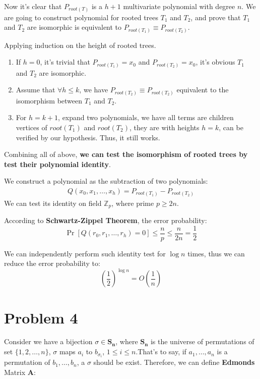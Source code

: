 \documentclass[a4paper, 12pt, titlepage]{article}
\begin{document}
Now it's clear that $P_{root(T)}$ is a $h + 1$ multivariate polynomial with degree $n$.
We are going to construct polynomial for rooted trees $T_{1}$ and $T_{2}$, and prove that $T_{1}$ and $T_{2}$ are isomorphic is equivalent to $P_{root(T_{1})} \equiv P_{root(T_{2})}$.

Applying induction on the height of rooted trees.
\begin{enumerate}[1]
    \item If $h = 0$, it's trivial that $P_{root(T_{1})} = x_{0}$ and $P_{root(T_{2})} = x_{0}$, it's obvious $T_{1}$ and $T_{2}$ are isomorphic.
    \item Assume that $\forall h \leq k$, we have $P_{root(T_{2})} \equiv P_{root(T_{2})}$ equivalent to the isomorphism between $T_{1}$ and $T_{2}$.
    \item For $h = k + 1$, expand two polynomials, we have all terms are children vertices of $root(T_{1})$ and $root(T_{2})$, they are with heights $h = k$, can be verified by our hypothesis.
          Thus, it still works.
\end{enumerate}
Combining all of above, \textbf{we can test the isomorphism of rooted trees by test their polynomial identity}. 

We construct a polynomial as the subtraction of two polynomials:
\begin{equation}
    \begin{aligned}
        Q \left(x_{0}, x_{1}, \ldots, x_{h} \right) = P_{root(T_{1})} - P_{root(T_{2})}
    \end{aligned}
\end{equation}
We can test its identity on field $\mathbb{Z}_{p}$, where prime $p \geq 2n$.

According to \textbf{Schwartz-Zippel Theorem}, the error probability:
\[
    \Pr \left[ Q(r_{0}, r_{1}, \ldots, r_{h}) = 0 \right] \leq \frac{n}{p} \leq \frac{n}{2n} = \frac{1}{2}
\]        

We can independently perform such identity test for $\log{n}$ times, thus we can reduce the error probability to:
\[
    \left( \frac{1}{2} \right)^{\log{n}} = O \left( \frac{1}{n} \right)
\]

\section{Problem 4}
Consider we have a bijection $\sigma \in \mathbf{S_{n}}$, where $\mathbf{S_{n}}$ is the universe of permutations of set $\{1,2, \ldots, n\}$,
$\sigma$ maps $a_{i}$ to $b_{\sigma_{i}}$, $1 \leq i \leq n$.That's to say, if $a_{1}, \ldots, a_{n}$ is a permutation of 
$b_{1}, \ldots, b_{n}$, a $\sigma$ should be exist.
Therefore, we can define \textbf{Edmonds} Matrix \textbf{A}:
\end{document}
